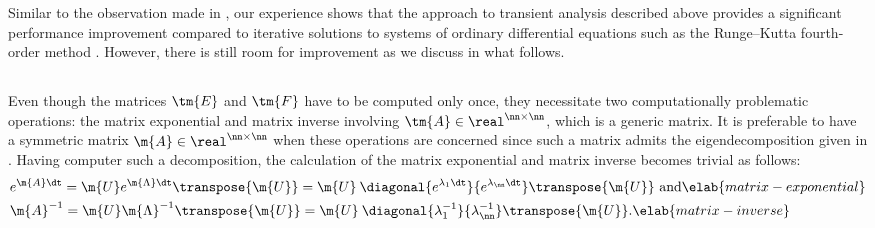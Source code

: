 Similar to the observation made in \cite{thiele2011}, our experience shows that
the approach to transient analysis described above provides a significant
performance improvement compared to iterative solutions to systems of ordinary
differential equations such as the Runge--Kutta fourth-order method
\cite{press2007}. However, there is still room for improvement as we discuss in
what follows.

\subsection{\solutiontitle}

Even though the matrices $\tm{E}$ and $\tm{F}$ have to be computed only once,
they necessitate two computationally problematic operations: the matrix
exponential and matrix inverse involving $\tm{A} \in \real^{\nn \times \nn}$,
which is a generic matrix. It is preferable to have a symmetric matrix $\m{A}
\in \real^{\nn \times \nn}$ when these operations are concerned since such a
matrix admits the eigendecomposition given in . Having
computer such a decomposition, the calculation of the matrix exponential and
matrix inverse becomes trivial as follows:
\begin{align}
  & e^{\m{A} \dt}
  = \m{U} e^{\m{\Lambda} \dt} \transpose{\m{U}}
  = \m{U} \: \diagonal{e^{\lambda_1 \dt}}{e^{\lambda_\nn \dt}} \transpose{\m{U}} \text{ and} \elab{matrix-exponential} \\
  & \m{A}^{-1}
  = \m{U} \m{\Lambda}^{-1} \transpose{\m{U}}
  = \m{U} \: \diagonal{\lambda_1^{-1}}{\lambda_\nn^{-1}} \transpose{\m{U}}. \elab{matrix-inverse}
\end{align}

